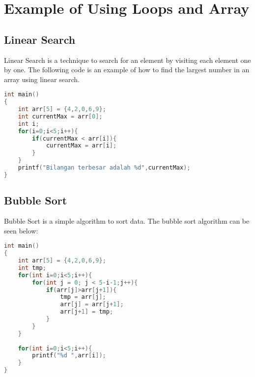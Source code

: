 \section{Example of Using Loops and Array}
\subsection{Linear Search}
Linear Search is a technique to search for an element by visiting each element one by one. 
The following code is an example of how to find the largest number in an array using linear search.
\begin{lstlisting}[language=c,caption = Finding the largest integer,label=lst:linearsearch01]
int main()
{
    int arr[5] = {4,2,0,6,9};
    int currentMax = arr[0];
    int i;
    for(i=0;i<5;i++){
        if(currentMax < arr[i]){
            currentMax = arr[i];
        }
    }
    printf("Bilangan terbesar adalah %d",currentMax);
}
\end{lstlisting}
\subsection{Bubble Sort}
Bubble Sort is a simple algorithm to sort data. The bubble sort algorithm can be seen below:
\begin{lstlisting}[language=c,caption = Bubble Sort,label=lst:bubblesort01]
int main()
{
    int arr[5] = {4,2,0,6,9};
    int tmp;
    for(int i=0;i<5;i++){
        for(int j = 0; j < 5-i-1;j++){
            if(arr[j]>arr[j+1]){
                tmp = arr[j];
                arr[j] = arr[j+1];
                arr[j+1] = tmp;
            }
        }
    }
    
    for(int i=0;i<5;i++){
        printf("%d ",arr[i]);
    }
}
\end{lstlisting}
